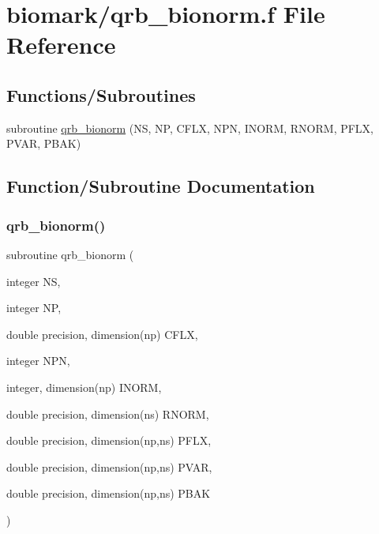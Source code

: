 \hypertarget{qrb__bionorm_8f}{}\section{biomark/qrb\+\_\+bionorm.f File Reference}
\label{qrb__bionorm_8f}
\subsection*{Functions/\+Subroutines}
\begin{DoxyCompactItemize}
\item 
subroutine \hyperlink{qrb__bionorm_8f_a35c315160e20b6d0ef96ac72678c51fa}{qrb\+\_\+bionorm} (NS, NP, C\+F\+LX, N\+PN, I\+N\+O\+RM, R\+N\+O\+RM, P\+F\+LX, P\+V\+AR, P\+B\+AK)
\end{DoxyCompactItemize}


\subsection{Function/\+Subroutine Documentation}
\mbox{\label{qrb__bionorm_8f_a35c315160e20b6d0ef96ac72678c51fa}} 
\subsubsection{\texorpdfstring{qrb\+\_\+bionorm()}{qrb\_bionorm()}}
{\footnotesize\ttfamily subroutine qrb\+\_\+bionorm (\begin{DoxyParamCaption}\item[{integer}]{NS,  }\item[{integer}]{NP,  }\item[{double precision, dimension(np)}]{C\+F\+LX,  }\item[{integer}]{N\+PN,  }\item[{integer, dimension(np)}]{I\+N\+O\+RM,  }\item[{double precision, dimension(ns)}]{R\+N\+O\+RM,  }\item[{double precision, dimension(np,ns)}]{P\+F\+LX,  }\item[{double precision, dimension(np,ns)}]{P\+V\+AR,  }\item[{double precision, dimension(np,ns)}]{P\+B\+AK }\end{DoxyParamCaption})}

